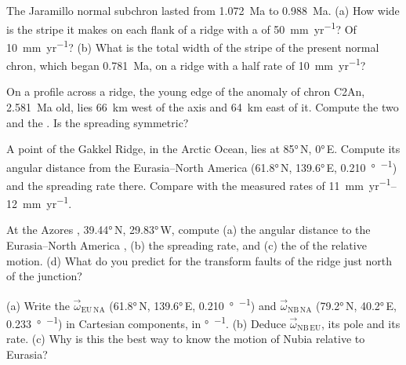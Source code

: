 \begin{exercise}[$\star$]\label{exo:b1:plate-kinematics:3}
The Jaramillo normal subchron lasted from \qty{1.072}{Ma} to \qty{0.988}{Ma}.
(a) How wide is the stripe it makes on each flank of a ridge with a  of \qty{50}{mm.yr^{-1}}? Of \qty{10}{mm.yr^{-1}}? (b) What is the
total width of the stripe of the present normal chron, which began
\qty{0.781}{Ma}, on a ridge with a half rate of \qty{10}{mm.yr^{-1}}?
\end{exercise}

\begin{exercise}[$\star$]\label{exo:b1:plate-kinematics:4}
On a profile across a ridge, the young edge of the anomaly of chron C2An,
\qty{2.581}{Ma} old, lies \qty{66}{km} west of the axis and \qty{64}{km} east of
it. Compute the two  and the . Is the
spreading symmetric?
\end{exercise}

\begin{exercise}[$\star\star$]\label{exo:b1:plate-kinematics:5}
A point of the Gakkel Ridge, in the Arctic Ocean, lies at \ang{85}\,N, \ang{0}\,E.
Compute its angular distance from the Eurasia--North America 
(\ang{61.8}\,N, \ang{139.6}\,E, \qty{0.210}{\degree\per\Myr}) and the spreading
rate there. Compare with the measured rates of \qtyrange{11}{12}{mm.yr^{-1}}.
\end{exercise}

\begin{exercise}[$\star\star$]\label{exo:b1:plate-kinematics:6}
At the Azores , \ang{39.44}\,N, \ang{29.83}\,W, compute (a) the
angular distance to the Eurasia--North America , (b) the spreading
rate, and (c) the  of the relative motion. (d) What  do you
predict for the transform faults of the ridge just north of the junction?
\end{exercise}

\begin{exercise}[$\star\star$]\label{exo:b1:plate-kinematics:7}
(a) Write the  $\vec\omega_{\mathrm{EU\,NA}}$ (\ang{61.8}\,N,
\ang{139.6}\,E, \qty{0.210}{\degree\per\Myr}) and $\vec\omega_{\mathrm{NB\,NA}}$
(\ang{79.2}\,N, \ang{40.2}\,E, \qty{0.233}{\degree\per\Myr}) in Cartesian
components, in \unit{\degree\per\Myr}. (b) Deduce $\vec\omega_{\mathrm{NB\,EU}}$,
its pole and its rate. (c) Why is this the best way to know the motion of Nubia
relative to Eurasia?
\end{exercise}

